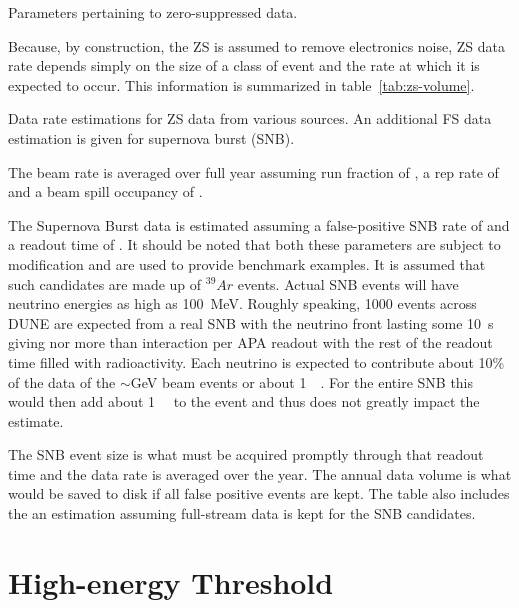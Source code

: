 \begin{table}[htbp]
  \centering
  \caption{Parameters pertaining to zero-suppressed data.}
  
  \label{tab:zs-parameters-table}
\end{table}

Because, by construction, the ZS is assumed to remove electronics
noise, ZS data rate depends simply on the size of a class of event and
the rate at which it is expected to occur.
This information is summarized in table~\ref{tab:zs-volume}.


\begin{table}[htbp]
  \centering
  \caption{Data rate estimations for ZS data from various sources.
  An additional FS data estimation is given for supernova burst (SNB).}
  
  \label{tab:zs-volume}
\end{table}

The beam rate is averaged over full year assuming run fraction of
\beamrunfraction, a rep rate of \beamreprate and a beam spill occupancy
of \beameventoccupancy.

The Supernova Burst data is estimated assuming a false-positive SNB
rate of \snbrate and a readout time of \snbreadouttime.
It should be noted that both these parameters are subject to
modification and are used to provide benchmark examples.
It is assumed that such candidates are made up of $^{39}Ar$ events.
Actual SNB events will have neutrino energies as high as
\SI{100}{\MeV}.
Roughly speaking, 1000 events across DUNE are expected from a real SNB
with the neutrino front lasting some \SI{10}{\second} giving nor more
than interaction per APA readout with the rest of the readout time
filled with radioactivity.
Each neutrino is expected to contribute about 10\% of the data of the
$\sim$\si{\GeV} beam events or about \SI{1}{\mega\byte}.
For the entire SNB this would then add about \SI{1}{\giga\byte} to the
event and thus does not greatly impact the estimate.

The SNB event size is what must be acquired promptly through that
readout time and the data rate is averaged over the year.
The annual data volume is what would be saved to disk if all false
positive events are kept.
The table also includes the an estimation assuming full-stream data is
kept for the SNB candidates.

\section{High-energy Threshold}

